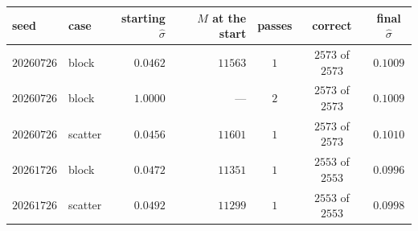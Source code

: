 \begin{center}
\footnotesize
\begin{tabular}{llrrccc}
seed & case & starting $\hat\sigma$ & $M$ at the start & passes & correct & final $\hat\sigma$ \\
\hline
$20260726$ & block & $0.0462$ & $11563$ & $1$ & $2573$ of $2573$ & $0.1009$ \\
$20260726$ & block & $1.0000$ & --- & $2$ & $2573$ of $2573$ & $0.1009$ \\
$20260726$ & scatter & $0.0456$ & $11601$ & $1$ & $2573$ of $2573$ & $0.1010$ \\
$20261726$ & block & $0.0472$ & $11351$ & $1$ & $2553$ of $2553$ & $0.0996$ \\
$20261726$ & scatter & $0.0492$ & $11299$ & $1$ & $2553$ of $2553$ & $0.0998$ \\
\end{tabular}
\end{center}
